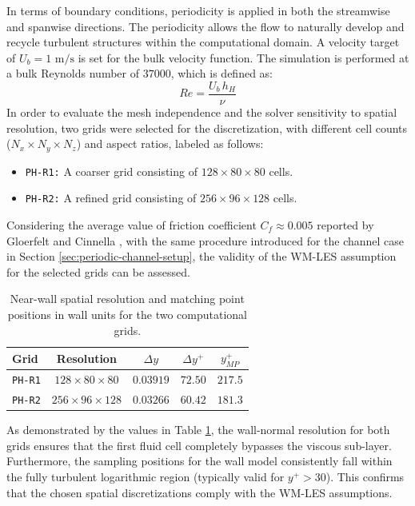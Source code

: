 \documentclass[12pt, a4paper, twoside, openright]{book}
\begin{document}
In terms of boundary conditions, periodicity is applied in both the streamwise and spanwise directions. The periodicity allows the flow to naturally develop and recycle turbulent structures within the computational domain. A velocity target of $U_b = 1 \text{ m/s}$ is set for the bulk velocity function. The simulation is performed at a bulk Reynolds number of $37000$, which is defined as:
\begin{equation}
	Re = \dfrac{U_b \, h_H}{\nu}
\end{equation}
In order to evaluate the mesh independence and the solver sensitivity to spatial resolution, two grids were selected for the discretization, with different cell counts ($N_x \times N_y \times N_z$) and aspect ratios, labeled as follows:
\begin{itemize}
	\item \texttt{PH-R1:} A coarser grid consisting of $128 \times 80 \times 80$ cells.
	\item \texttt{PH-R2:} A refined grid consisting of $256 \times 96 \times 128$ cells.
\end{itemize}
%
Considering the average value of friction coefficient $C_f \approx 0.005$ reported by Gloerfelt and Cinnella \cite{cinnella}, with the same procedure introduced for the channel case in Section \ref{sec:periodic-channel-setup}, the validity of the WM-LES assumption for the selected grids can be assessed.
\begin{table}[h]
	\centering
	\renewcommand{\arraystretch}{1.2}
	\setlength{\tabcolsep}{15pt}
	\begin{tabular}{lcccc}
		\hline
		\textbf{Grid} & \textbf{Resolution} & $\Delta y$ \text{[m]} & $\Delta y^+$ & $y_{MP}^+$ \\
		\hline
		\texttt{PH-R1} & $128 \times 80 \times 80$   & $0.03919$ & $72.50$ & $217.5$ \\
		\texttt{PH-R2} & $256 \times 96 \times 128$  & $0.03266$ & $60.42$ & $181.3$ \\
		\hline
	\end{tabular}
	\caption{Near-wall spatial resolution and matching point positions in wall units for the two computational grids.}
	\label{tab:grid-wall-units}
\end{table}
As demonstrated by the values in Table \ref{tab:grid-wall-units}, the wall-normal resolution for both grids ensures that the first fluid cell completely bypasses the viscous sub-layer. Furthermore, the sampling positions for the wall model consistently fall within the fully turbulent logarithmic region (typically valid for $y^+ > 30$). This confirms that the chosen spatial discretizations comply with the WM-LES assumptions.
\end{document}

